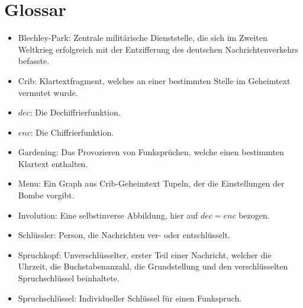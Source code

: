 \documentclass[ngerman, a4paper, footsepline, headsepline]{scrreport}
\newcommand{\fmbox}[1]{
	\begin{center}
		\fcolorbox{black}{yellow}
		{\parbox{0.88\textwidth}
			{\textcolor{black}
				{#1}
			}
		}
	\end{center}
}
\begin{document}
	
	
%	
%	
%	
%	
%	
%	
%	
%	
%	
%	
%	

	\chapter{Glossar}
	\begin{itemize}
		\item Blechley-Park: Zentrale militärische Dienststelle, die sich im Zweiten Weltkrieg erfolgreich mit der Entzifferung des deutschen Nachrichtenverkehrs befasste.
		\item Crib: Klartextfragment, welches an einer bestimmten Stelle im Geheimtext vermutet wurde.
		\item $dec$: Die Dechiffrierfunktion.
		\item $enc$: Die Chiffrierfunktion.
		\item Gardening: Das Provozieren von Funksprüchen, welche einen bestimmten Klartext enthalten.
		\item Menu: Ein Graph aus Crib-Geheimtext Tupeln, der die Einstellungen der Bombe vorgibt.
		\item Involution: Eine selbstinverse Abbildung, hier auf $dec = enc$ bezogen.
		\item Schlüssler: Person, die Nachrichten ver- oder entschlüsselt.
		\item Spruchkopf: Unverschlüsselter, erster Teil einer Nachricht, welcher die Uhrzeit, die Buchstabenanzahl, die Grundstellung und den verschlüsselten Spruchschlüssel beinhaltete.
		\item Spruchschlüssel:  Individueller Schlüssel für einen Funkspruch.
	\end{itemize}
	
\end{document}
